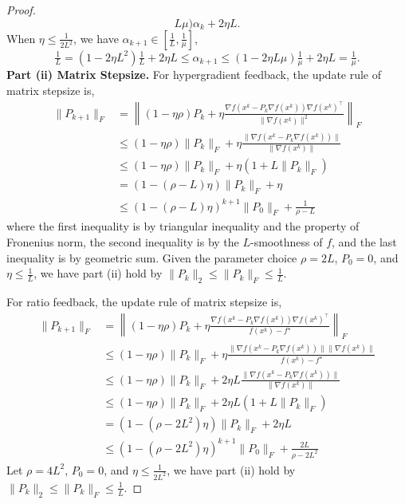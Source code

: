 \documentclass{article}
\theoremstyle{definition}
\begin{document}
\begin{proof}
\[     L \mu) \alpha_k + 2 \eta L. \]
  When $\eta \leq \tfrac{1}{2 L^2}$, we have $\alpha_{k + 1} \in \left[
  \frac{1}{L}, \frac{1}{\mu} \right]$,
  \[ \tfrac{1}{L} = (1 - 2 \eta L^2)  \tfrac{1}{L} + 2 \eta L \leq \alpha_{k +
     1} \leq (1 - 2 \eta L \mu)  \tfrac{1}{\mu} + 2 \eta L = \tfrac{1}{\mu} .
  \]
  \textbf{Part (ii) Matrix Stepsize.} For hypergradient feedback, the update rule of matrix
  stepsize is,
  \begin{align*}
    \| P_{k + 1} \|_F &{}= \left\| (1 - \eta \rho) P_k + \eta \tfrac{\nabla f
    (x^k - P_k \nabla f (x^k)) \nabla f (x^k)^{\top}}{\| \nabla f (x^k) \|^2}
    \right\|_F\\
    &{}\leq (1 - \eta \rho) \| P_k \|_F + \eta \tfrac{\| \nabla f (x^k - P_k
    \nabla f (x^k)) \|}{\| \nabla f (x^k) \|}\\
    &{}\leq (1 - \eta \rho) \| P_k \|_F + \eta (1 + L \| P_k \|_F)\\
    &{}= (1 - (\rho - L) \eta) \| P_k \|_F + \eta\\
    &{}\leq (1 - (\rho - L) \eta)^{k + 1} \| P_0 \|_F + \tfrac{1}{\rho - L}
  \end{align*}
  where the first inequality is by triangular inequality and the property of
  Fronenius norm, the second inequality is by the $L$-smoothness of $f$, and
  the last inequality is by geometric sum. Given the parameter choice $\rho =
  2 L$, $P_0 = 0$, and $\eta \leq \tfrac{1}{L}$, we have part (ii) hold by $\|
  P_k \|_2 \leq \| P_k \|_F \leq \tfrac{1}{L}$.
  
  For ratio feedback, the update rule of matrix stepsize is,
  \begin{align*}
    \| P_{k + 1} \|_F &{}= \left\| (1 - \eta \rho) P_k + \eta \tfrac{\nabla f
    (x^k - P_k \nabla f (x^k)) \nabla f (x^k)^{\top}}{f (x^k) - f^{\star}}
    \right\|_F\\
    &{}\leq (1 - \eta \rho) \| P_k \|_F + \eta \tfrac{\| \nabla f (x^k - P_k
    \nabla f (x^k)) \| \| \nabla f (x^k) \|}{f (x^k) - f^{\star}}\\
    &{}\leq (1 - \eta \rho) \| P_k \|_F + 2 \eta L \tfrac{\| \nabla f (x^k -
    P_k \nabla f (x^k)) \|}{\| \nabla f (x^k) \|}\\
    &{}\leq (1 - \eta \rho) \| P_k \|_F + 2 \eta L (1 + L \| P_k \|_F)\\
    &{}= (1 - (\rho - 2 L^2) \eta) \| P_k \|_F + 2 \eta L\\
    &{}\leq (1 - (\rho - 2 L^2) \eta)^{k + 1} \| P_0 \|_F + \tfrac{2 L}{\rho
    - 2 L^2}
  \end{align*}
  Let $\rho = 4 L^2$, $P_0 = 0$, and $\eta \leq \tfrac{1}{2 L^2}$, we have
  part (ii) hold by $\| P_k \|_2 \leq \| P_k \|_F \leq \tfrac{1}{L}$.
\end{proof}
\end{document}
